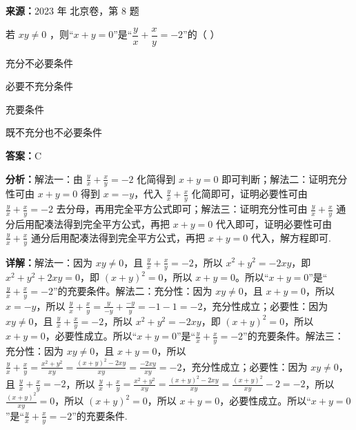 \begin{question}[points=4]
\textbf{来源：}2023 年 北京卷，第 8 题\par
若 $xy \neq 0$ ，则“$x + y = 0$”是“$\dfrac{y}{x} + \dfrac{x}{y} = -2$”的（ ）
\begin{choices}
  \item 充分不必要条件
  \item 必要不充分条件
  \item 充要条件
  \item 既不充分也不必要条件
\end{choices}
\begin{solution}
\textbf{答案：}C

\textbf{分析：}解法一：由 $\frac{y}{x} + \frac{x}{y} = -2$ 化简得到 $x+y=0$ 即可判断；解法二：证明充分性可由 $x+y=0$ 得到 $x=-y$，代入 $\frac{y}{x}+\frac{x}{y}$ 化简即可，证明必要性可由 $\frac{y}{x}+\frac{x}{y}=-2$ 去分母，再用完全平方公式即可；解法三：证明充分性可由 $\frac{y}{x}+\frac{x}{y}$ 通分后用配凑法得到完全平方公式，再把 $x+y=0$ 代入即可，证明必要性可由 $\frac{y}{x}+\frac{x}{y}$ 通分后用配凑法得到完全平方公式，再把 $x+y=0$ 代入，解方程即可.

\textbf{详解：}解法一：因为 $xy \neq 0$，且 $\frac{y}{x}+\frac{x}{y} = -2$，所以 $x^2+y^2 = -2xy$，即 $x^2+y^2+2xy=0$，即 $(x+y)^2=0$，所以 $x+y=0$。所以“$x+y=0$”是“$\frac{y}{x}+\frac{x}{y}=-2$”的充要条件。解法二：充分性：因为 $xy \neq 0$，且 $x+y=0$，所以 $x=-y$，所以 $\frac{y}{x}+\frac{x}{y} = \frac{y}{-y}+\frac{-y}{y} = -1-1 = -2$，充分性成立；必要性：因为 $xy \neq 0$，且 $\frac{y}{x}+\frac{x}{y} = -2$，所以 $x^2+y^2 = -2xy$，即 $(x+y)^2=0$，所以 $x+y=0$，必要性成立。所以“$x+y=0$”是“$\frac{y}{x}+\frac{x}{y}=-2$”的充要条件。解法三：充分性：因为 $xy \neq 0$，且 $x+y=0$，所以 $\frac{y}{x}+\frac{x}{y} = \frac{x^2+y^2}{xy} = \frac{(x+y)^2-2xy}{xy} = \frac{-2xy}{xy} = -2$，充分性成立；必要性：因为 $xy \neq 0$，且 $\frac{y}{x}+\frac{x}{y} = -2$，所以 $\frac{y}{x}+\frac{x}{y} = \frac{x^2+y^2}{xy} = \frac{(x+y)^2-2xy}{xy} = \frac{(x+y)^2}{xy} - 2 = -2$，所以 $\frac{(x+y)^2}{xy} = 0$，所以 $(x+y)^2=0$，所以 $x+y=0$，必要性成立。所以“$x+y=0$”是“$\frac{y}{x}+\frac{x}{y}=-2$”的充要条件.
\end{solution}
\end{question}

